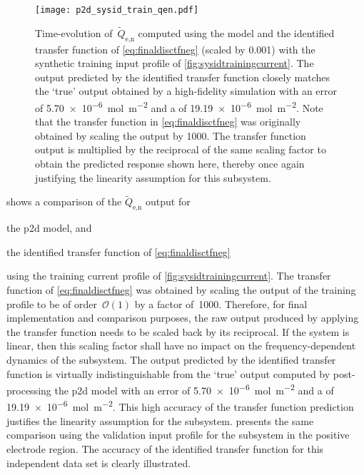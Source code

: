 \begin{figure}[!htbp]
    \centering
    \texttt{[image: p2d\_sysid\_train\_qen.pdf]}
    \caption[$\widetilde{Q}_{\text{e,n}}(t)$ outputs from  and
    identified transfer function for training profile]{%
        Time-evolution of~$\widetilde{Q}_{\text{e,n}}$ computed using the
         model  and the identified transfer function
        of \cref{eq:finaldisctfneg} (scaled by 0.001) with the synthetic
        training input profile of \cref{fig:sysidtrainingcurrent}. The output
        predicted by the identified transfer function closely matches the `true'
        output obtained by a high-fidelity  simulation with an
         error of \SI{5.70e-6}{\mole\per\meter\squared} and a
         of \SI{19.19e-6}{\mole\per\meter\squared}. Note that the
        transfer function in \cref{eq:finaldisctfneg} was originally obtained by
        scaling the output by 1000. The transfer function output is
        multiplied by the reciprocal of the same scaling factor to obtain the
        predicted response shown here, thereby once again justifying the
        linearity assumption for this subsystem.
    }%
    \label{fig:tfpredQentrain}
\end{figure}

 shows a comparison of the $\widetilde{Q}_{\text{e,n}}$
output for
\begin{enumerate*}[label=\emph{\alph*})]
    \item the \gls{p2d} model, and
    \item the identified transfer function of \cref{eq:finaldisctfneg}
\end{enumerate*}
using  the  training  current  profile  of \cref{fig:sysidtrainingcurrent}.  The
transfer function of \cref{eq:finaldisctfneg} was obtained by scaling the output
of the  training profile to  be of order~$\mathcal{O}(1)$  by a factor  of~1000.
Therefore,  for final  implementation and  comparison purposes,  the raw  output
produced  by applying  the transfer  function  needs to  be scaled  back by  its
reciprocal. If  the system  is linear,  then this scaling  factor shall  have no
impact  on  the  frequency-dependent  dynamics  of  the  subsystem.  The  output
predicted  by the  identified transfer  function is  virtually indistinguishable
from  the `true'  output computed  by post-processing  the \gls{p2d}  model with
an    error   of  \SI{5.70e-6}{\mole\per\meter\squared}  and  a
 of \SI{19.19e-6}{\mole\per\meter\squared}.  This high accuracy
of the transfer  function prediction justifies the linearity  assumption for the
subsystem.    presents  the  same  comparison  using  the
validation input profile for the subsystem in the positive electrode region. The
accuracy of  the identified transfer function  for this independent data  set is
clearly illustrated.

